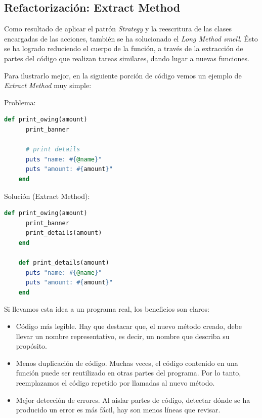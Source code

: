\subsection{Refactorización: Extract Method}
\label{2.2.3}

Como resultado de aplicar el patrón {\it Strategy} y la reescritura de las clases encargadas de las acciones, también se ha solucionado el {\it Long Method smell}. Ésto se ha logrado reduciendo el cuerpo de la función, a través de la extracción de partes del código que realizan tareas similares,
dando lugar a nuevas funciones.
\bigskip

Para ilustrarlo mejor, en la siguiente porción de código vemos un ejemplo de {\it Extract Method} \cite{Fowler:1999} muy simple:
\bigskip 

\begin{minipage}[t]{0.45\linewidth}
  Problema:
  \begin{lstlisting}[language=Ruby]
    def print_owing(amount)
      print_banner

      # print details
      puts "name: #{@name}"
      puts "amount: #{amount}"
    end
  \end{lstlisting}
\end{minipage}
\begin{minipage}[t]{0.5\linewidth}
    Solución (Extract Method):
  \begin{lstlisting}[language=Ruby]
    def print_owing(amount)
      print_banner
      print_details(amount)
    end

    def print_details(amount)
      puts "name: #{@name}"
      puts "amount: #{amount}"
    end
  \end{lstlisting}
\end{minipage}
\bigskip

Si llevamos esta idea a un programa real, los beneficios son claros:
\begin{itemize}
  \item Código más legible. Hay que destacar que, el nuevo método creado, debe llevar un nombre representativo, es decir, un nombre que describa su propósito.
  \item Menos duplicación de código. Muchas veces, el código contenido en una función puede ser reutilizado en otras partes del programa. Por lo tanto, reemplazamos el código repetido por llamadas al nuevo método.
  \item Mejor detección de errores. Al aislar partes de código, detectar dónde se ha producido un error es más fácil, hay son menos líneas que revisar.
\end{itemize}

